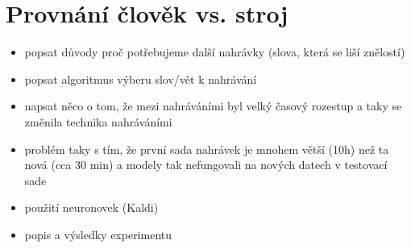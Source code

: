 \section{Provnání člověk vs. stroj}
\label{chap:experiments:normalization}

\begin{itemize}
  \item popsat důvody proč potřebujeme další nahrávky (slova, která se liší znělostí)
  \item popsat algoritmus výberu slov/vět k nahrávání
  \item napsat něco o tom, že mezi nahráváními byl velký časový rozestup a taky se změnila technika nahráváními
  \item problém taky s tím, že první sada nahrávek je mnohem větší (10h) než ta nová (cca 30 min) a modely tak nefungovali na nových datech v testovací sade
  \item použití neuronovek (Kaldi)
  \item popis a výsledky experimentu 
\end{itemize}
